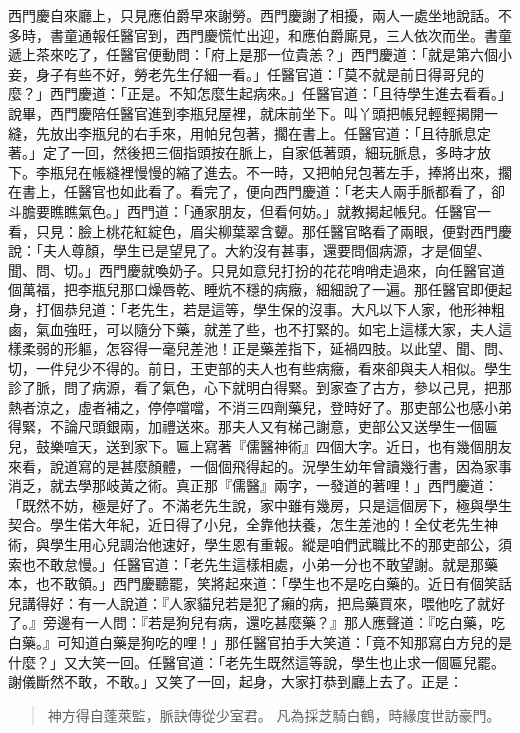 西門慶自來廳上，只見應伯爵早來謝勞。西門慶謝了相擾，兩人一處坐地說話。不多時，書童通報任醫官到，西門慶慌忙出迎，和應伯爵廝見，三人依次而坐。書童遞上茶來吃了，任醫官便動問：「府上是那一位貴恙？」西門慶道：「就是第六個小妾，身子有些不好，勞老先生仔細一看。」任醫官道：「莫不就是前日得哥兒的麼？」西門慶道：「正是。不知怎麼生起病來。」任醫官道：「且待學生進去看看。」說畢，西門慶陪任醫官進到李瓶兒屋裡，就床前坐下。叫丫頭把帳兒輕輕揭開一縫，先放出李瓶兒的右手來，用帕兒包著，擱在書上。任醫官道：「且待脈息定著。」定了一回，然後把三個指頭按在脈上，自家低著頭，細玩脈息，多時才放下。李瓶兒在帳縫裡慢慢的縮了進去。不一時，又把帕兒包著左手，捧將出來，擱在書上，任醫官也如此看了。看完了，便向西門慶道：「老夫人兩手脈都看了，卻斗膽要瞧瞧氣色。」西門道：「通家朋友，但看何妨。」就教揭起帳兒。任醫官一看，只見：臉上桃花紅綻色，眉尖柳葉翠含顰。那任醫官略看了兩眼，便對西門慶說：「夫人尊顏，學生已是望見了。大約沒有甚事，還要問個病源，才是個望、聞、問、切。」西門慶就喚奶子。只見如意兒打扮的花花哨哨走過來，向任醫官道個萬福，把李瓶兒那口燥唇乾、睡炕不穩的病癥，細細說了一遍。那任醫官即便起身，打個恭兒道：「老先生，若是這等，學生保的沒事。大凡以下人家，他形神粗鹵，氣血強旺，可以隨分下藥，就差了些，也不打緊的。如宅上這樣大家，夫人這樣柔弱的形軀，怎容得一毫兒差池！正是藥差指下，延禍四肢。以此望、聞、問、切，一件兒少不得的。前日，王吏部的夫人也有些病癥，看來卻與夫人相似。學生診了脈，問了病源，看了氣色，心下就明白得緊。到家查了古方，參以己見，把那熱者涼之，虛者補之，停停噹噹，不消三四劑藥兒，登時好了。那吏部公也感小弟得緊，不論尺頭銀兩，加禮送來。那夫人又有梯己謝意，吏部公又送學生一個匾兒，鼓樂喧天，送到家下。匾上寫著『儒醫神術』四個大字。近日，也有幾個朋友來看，說道寫的是甚麼顏體，一個個飛得起的。況學生幼年曾讀幾行書，因為家事消乏，就去學那岐黃之術。真正那『儒醫』兩字，一發道的著哩！」西門慶道：「既然不妨，極是好了。不滿老先生說，家中雖有幾房，只是這個房下，極與學生契合。學生偌大年紀，近日得了小兒，全靠他扶養，怎生差池的！全仗老先生神術，與學生用心兒調治他速好，學生恩有重報。縱是咱們武職比不的那吏部公，須索也不敢怠慢。」任醫官道：「老先生這樣相處，小弟一分也不敢望謝。就是那藥本，也不敢領。」西門慶聽罷，笑將起來道：「學生也不是吃白藥的。近日有個笑話兒講得好：有一人說道：『人家貓兒若是犯了癩的病，把烏藥買來，喂他吃了就好了。』旁邊有一人問：『若是狗兒有病，還吃甚麼藥？』那人應聲道：『吃白藥，吃白藥。』可知道白藥是狗吃的哩！」那任醫官拍手大笑道：「竟不知那寫白方兒的是什麼？」又大笑一回。任醫官道：「老先生既然這等說，學生也止求一個匾兒罷。謝儀斷然不敢，不敢。」又笑了一回，起身，大家打恭到廳上去了。正是：
\begin{quote}
神方得自蓬萊監，脈訣傳從少室君。
凡為採芝騎白鶴，時緣度世訪豪門。
\end{quote}
